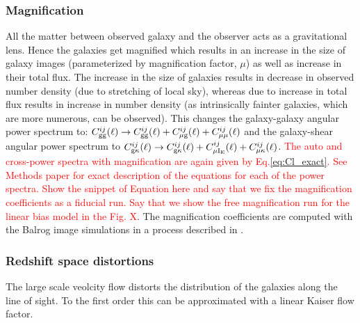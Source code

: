 \documentclass[fleqn,usenatbib]{mnras}
\newcommand{\redmagic}{\texttt{redMaGiC} }
\newcommand{\red}[1]{\textcolor{red}{#1}}
\begin{document}
\subsubsection{Magnification}
All the matter between observed galaxy and the observer acts as a gravitational lens. Hence the galaxies get magnified which results in an increase in the size of galaxy images (parameterized by magnification factor, $\mu$) as well as increase in their total flux. The increase in the size of galaxies results in decrease in observed number density (due to stretching of local sky), whereas due to increase in total flux results in increase in number density (as intrinsically fainter galaxies, which are more numerous, can be observed). This changes the galaxy-galaxy angular power spectrum to: $C^{ij}_{\rm gg}(\ell) \to C^{ij}_{\rm gg}(\ell) + C^{ij}_{\rm \mu g}(\ell) + C^{ij}_{\rm \mu \mu}(\ell) $ and the galaxy-shear angular power spectrum to $C^{ij}_{\rm g\kappa}(\ell) \to C^{ij}_{\rm g\kappa}(\ell) + C^{ij}_{\rm \mu I_{\rm E}}(\ell) + C^{ij}_{\rm \mu \kappa}(\ell)$. \red{The auto and cross-power spectra with magnification are again given by Eq.\ref{eq:Cl_exact}. See Methods paper for exact description of the equations for each of the power spectra. Show the snippet of Equation here and say that we fix the magnification coefficients as a fiducial run. Say that we show the free magnification run for the linear bias model in the Fig. X}. 
The magnification coefficients are computed with the Balrog image simulations \cite{Suchyta2016,balrog} in a process described in \cite{magnification}. 

\subsubsection{Redshift space distortions}    
The large scale veolcity flow distorts the distribution of the galaxies along the line of sight. To the first order this can be approximated with a linear Kaiser flow factor.  
\end{document}
